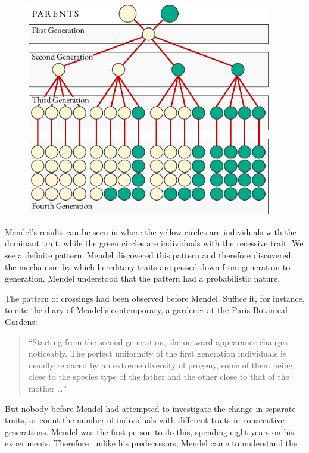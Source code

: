\begin{figure}[!ht]
\centering
\includegraphics[width=0.95\textwidth]{figures/mendel-expt.pdf}
\end{figure}

Mendel's results can be seen in  where the yellow circles are
individuals with the dominant trait, while the green circles are
individuals with the recessive trait. We see a definite pattern. Mendel
discovered this pattern and therefore discovered the mechanism by
which hereditary traits are passed down from generation to generation.
Mendel understood that the pattern had a probabilistic nature.


The pattern of crossings had been observed before Mendel. Suffice it,
for instance, to cite the diary of Mendel's contemporary, a gardener at
the Paris Botanical Gardens: 
\begin{quote}
``Starting from the second generation, the outward appearance changes noticeably. The perfect uniformity of the first generation individuals is usually replaced by an extreme diversity of progeny, some of them being close to the species type of the father and the other close to that of the mother \ldots'' 
\end{quote}
But nobody before Mendel had attempted to investigate the change in separate traits, or count the number of individuals with different traits in consecutive generations. Mendel was the first person to do this, spending eight years on his
experiments. Therefore, unlike his predecessors, Mendel came to
understand the .

